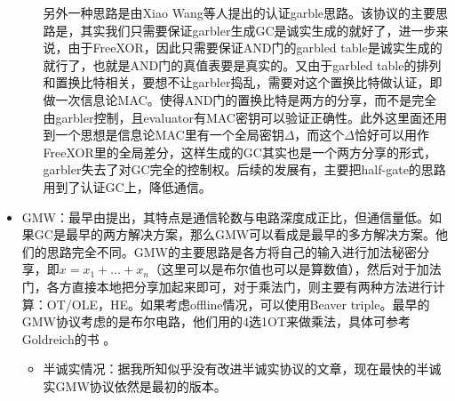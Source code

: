 \documentclass[UTF8]{ctexart}
\theoremstyle{nonumberplain}
\theoremstyle{plain}
\begin{document}
\begin{itemize}
\begin{itemize}
另外一种思路是由Xiao Wang等人\cite{DBLP:conf/ccs/WangRK17}提出的认证garble思路。该协议的主要思路是，其实我们只需要保证garbler生成GC是诚实生成的就好了，进一步来说，由于FreeXOR，因此只需要保证AND门的garbled table是诚实生成的就行了，也就是AND门的真值表要是真实的。又由于garbled table的排列和置换比特相关，要想不让garbler捣乱，需要对这个置换比特做认证，即做一次信息论MAC。使得AND门的置换比特是两方的分享，而不是完全由garbler控制，且evaluator有MAC密钥可以验证正确性。此外这里面还用到一个思想是信息论MAC里有一个全局密钥$\Delta$，而这个$\Delta$恰好可以用作FreeXOR里的全局差分，这样生成的GC其实也是一个两方分享的形式，garbler失去了对GC完全的控制权。后续的发展有\cite{DBLP:conf/crypto/KatzRR018}，主要把half-gate的思路用到了认证GC上，降低通信。
\end{itemize}
\item GMW：最早由\cite{DBLP:conf/stoc/GoldreichMW87}提出，其特点是通信轮数与电路深度成正比，但通信量低。如果GC是最早的两方解决方案，那么GMW可以看成是最早的多方解决方案。他们的思路完全不同。GMW的主要思路是各方将自己的输入进行加法秘密分享，即$x=x_1+\dots+ x_n$（这里可以是布尔值也可以是算数值），然后对于加法门，各方直接本地把分享加起来即可，对于乘法门，则主要有两种方法进行计算：OT/OLE，HE。如果考虑offline情况，可以使用Beaver triple。最早的GMW协议考虑的是布尔电路，他们用的4选1OT来做乘法，具体可参考Goldreich的书 \cite{DBLP:books/cu/Goldreich2004}。
\begin{itemize}
\item 半诚实情况：据我所知似乎没有改进半诚实协议的文章，现在最快的半诚实GMW协议依然是最初的版本\cite{DBLP:conf/stoc/GoldreichMW87}。


\end{itemize}
\end{itemize}
\end{document}
